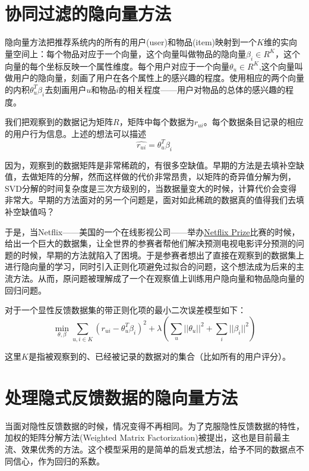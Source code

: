 \documentclass[notitlepage,cs4size,punct,oneside]{ctexrep}
\numberwithin{equation}{chapter}
\theoremstyle{mystyle}
\begin{document}
\section{协同过滤的隐向量方法}
隐向量方法把推荐系统内的所有的用户(user)和物品(item)映射到一个$K$维的实向量空间上：每个物品对应于一个向量，这个向量叫做物品的隐向量$\beta_i\in R^K$，这个向量的每个坐标反映一个属性维度。每个用户对应于一个向量$\theta_u\in R^K$,这个向量叫做用户的隐向量，刻画了用户在各个属性上的感兴趣的程度。使用相应的两个向量的内积$\theta_u^T\beta_i$去刻画用户$u$和物品$i$的相关程度——用户对物品的总体的感兴趣的程度。
\par
我们把观察到的数据记为矩阵$R$，矩阵中每个数据为$r_{ui}$。每个数据条目记录的相应的用户行为信息。上述的想法可以描述$$\hat{r_{ui}}=\theta_u^T\beta_i$$
\par
因为，观察到的数据矩阵是非常稀疏的，有很多空缺值。早期的方法是去填补空缺值，去做矩阵的分解，然而这样做的代价非常昂贵，以矩阵的奇异值分解为例，SVD分解的时间复杂度是三次方级别的，当数据量变大的时候，计算代价会变得非常大。早期的方法面对的另一个问题是，面对如此稀疏的数据真的值得我们去填补空缺值吗？
\par
于是，当Netflix——美国的一个在线影视公司——举办\href{http://www.netflixprize.com/}{Netflix Prize}比赛的时候，给出一个巨大的数据集，让全世界的参赛者帮他们解决预测电视电影评分预测的问题的时候，早期的方法就陷入了困境。于是参赛者想出了直接在观察到的数据集上进行隐向量的学习，同时引入正则化项避免过拟合的问题，这个想法成为后来的主流方法。从而，原问题被理解成了一个在观察值上训练用户隐向量和物品隐向量的回归问题。
\par
对于一个显性反馈数据集的带正则化项的最小二次误差模型如下：
\begin{equation}\label{ExplicitMF}
\min_{\theta,\beta}\sum_{u,i\in K}(r_{ui}-\theta_u^T\beta_i)^2+\lambda(\sum_u||\theta_u||^2+\sum_i||\beta_i||^2)
\end{equation}
\par
这里$K$是指被观察到的、已经被记录的数据对的集合（比如所有的用户评分）。

\section{处理隐式反馈数据的隐向量方法}\label{introToWMF}
当面对隐性反馈数据的时候，情况变得不再相同。为了克服隐性反馈数据的特性，加权的矩阵分解方法(Weighted Matrix Factorization)\cite{WMF}被提出，这也是目前最主流、效果优秀的方法。这个模型采用的是简单的启发式想法，给予不同的数据点不同信心，作为回归的系数。
\end{document}
